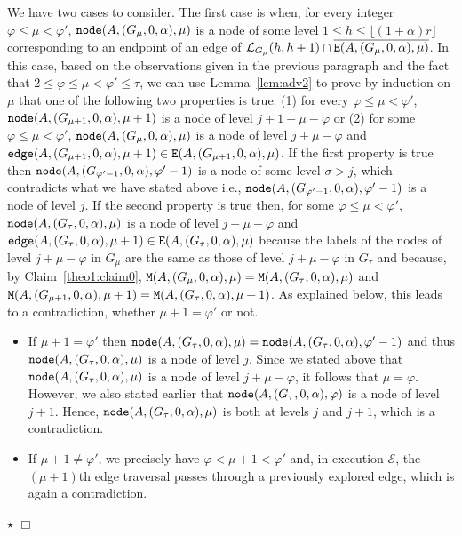 \documentclass[11pt]{article}
\newcommand{\qed}{\hfill $\Box$ \bigbreak}
\newenvironment{proof}{\noindent {\bf Proof.}}{\qed}
\newenvironment{proofclaim}{\noindent{\bf Proof of the claim.}}{\hfill$\star$}
\begin{document}
{\begin{proof}
\begin{proofclaim}
We have two cases to consider. The first case is when, for every integer $\varphi\leq\mu<\varphi'$, ${\tt node}(A,(G_{\mu},0,\alpha),\mu)$ is a node of some level $1\leq h\leq\lfloor(1+\alpha)r\rfloor$ corresponding to an endpoint of an edge of $\mathcal{L}_{G_\mu}(h,h+1)\cap\overline{{\tt E}(A,(G_\mu,0,\alpha),\mu)}$. In this case, based on the observations given in the previous paragraph and the fact that $2\leq\varphi\leq\mu<\varphi'\leq\tau$, we can use Lemma~\ref{lem:adv2} to prove by induction on $\mu$ that one of the following two properties is true: (1) for every $\varphi\leq\mu<\varphi'$, ${\tt node}(A,(G_{\mu+1},0,\alpha),\mu+1)$ is a node of level $j+1+\mu-\varphi$ or (2) for some $\varphi\leq\mu<\varphi'$, ${\tt node}(A,(G_{\mu},0,\alpha),\mu)$ is a node of level $j+\mu-\varphi$ and ${\tt edge}(A,(G_{\mu+1},0,\alpha),\mu+1)\in{\tt E}(A,(G_{\mu+1},0,\alpha),\mu)$. If the first property is true then ${\tt node}(A,(G_{\varphi'-1},0,\alpha),\varphi'-1)$ is a node of some level $\sigma>j$, which contradicts what we have stated above i.e., ${\tt node}(A,(G_{\varphi'-1},0,\alpha),\varphi'-1)$ is a node of level $j$. If the second property is true then, for some $\varphi\leq\mu<\varphi'$, ${\tt node}(A,(G_{\tau},0,\alpha),\mu)$ is a node of level $j+\mu-\varphi$ and ${\tt edge}(A,(G_{\tau},0,\alpha),\mu+1)\in{\tt E}(A,(G_{\tau},0,\alpha),\mu)$ because the labels of the nodes of level $j+\mu-\varphi$ in $G_{\mu}$ are the same as those of level $j+\mu-\varphi$ in $G_{\tau}$ and because, by Claim~\ref{theo1:claim0}, ${\tt M}(A,(G_{\mu},0,\alpha),\mu)={\tt M}(A,(G_\tau,0,\alpha),\mu)$ and ${\tt M}(A,(G_{\mu+1},0,\alpha),\mu+1)={\tt M}(A,(G_\tau,0,\alpha),\mu+1)$. As explained below, this leads to a contradiction, whether $\mu+1=\varphi'$ or not.
\begin{itemize}
\item If $\mu+1=\varphi'$ then 
${\tt node}(A,(G_{\tau},0,\alpha),\mu)={\tt node}(A,(G_{\tau},0,\alpha),\varphi'-1)$ and thus ${\tt node}(A,(G_{\tau},0,\alpha),\mu)$ is a node of level $j$. Since we stated above that ${\tt node}(A,(G_{\tau},0,\alpha),\mu)$ is a node of level $j+\mu-\varphi$, it follows that $\mu=\varphi$. However, we also stated earlier that ${\tt node}(A,(G_{\tau},0,\alpha),\varphi)$ is a node of level $j+1$. Hence, ${\tt node}(A,(G_{\tau},0,\alpha),\mu)$ is both at levels $j$ and $j+1$, which is a contradiction.

\item If $\mu+1\ne\varphi'$, we precisely have $\varphi<\mu+1<\varphi'$ and, in execution $\mathcal{E}$, the $(\mu+1)$th edge traversal passes through a previously explored edge, which is again a contradiction.
\end{itemize}


\end{proofclaim}
\end{proof}}
\end{document}
